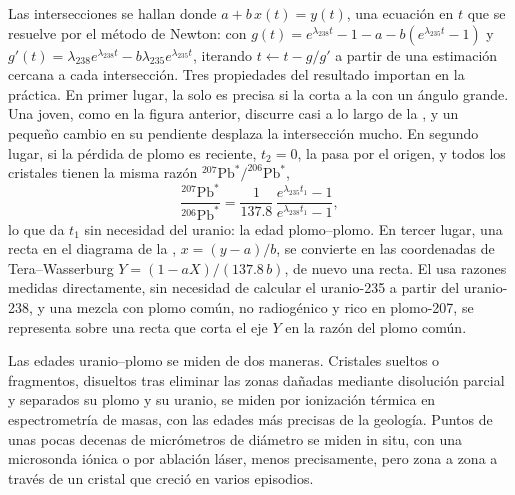 
Las intersecciones se hallan donde $a + b\,x(t) = y(t)$, una ecuación en $t$ que
se resuelve por el método de Newton: con $g(t) = e^{\lambda_{238}t} - 1 - a -
b(e^{\lambda_{235}t} - 1)$ y $g'(t) = \lambda_{238}e^{\lambda_{238}t} -
b\lambda_{235}e^{\lambda_{235}t}$, iterando $t \leftarrow t - g/g'$ a partir de una estimación
cercana a cada intersección. Tres propiedades del resultado importan en la práctica.
En primer lugar, la  solo es precisa si la  corta a la
 con un ángulo grande. Una  joven, como en la figura anterior, discurre
casi a lo largo de la , y un pequeño cambio en su pendiente desplaza la
intersección mucho. En segundo lugar, si la pérdida de plomo es reciente, $t_2 = 0$, la 
pasa por el origen, y todos los cristales tienen la misma
razón $^{207}\mathrm{Pb}^*/^{206}\mathrm{Pb}^*$,
\[
\frac{^{207}\mathrm{Pb}^*}{^{206}\mathrm{Pb}^*} = \frac{1}{137.8}\,
\frac{e^{\lambda_{235}t_1} - 1}{e^{\lambda_{238}t_1} - 1},
\]
lo que da $t_1$ sin necesidad del uranio: la edad plomo--plomo. En tercer lugar, una recta en el
diagrama de la , $x = (y - a)/b$, se convierte en las coordenadas de Tera--Wasserburg
$Y = (1 - aX)/(137.8\,b)$, de nuevo una recta. El 
usa razones medidas directamente, sin necesidad de calcular el uranio-235
a partir del uranio-238, y una mezcla con plomo común, no radiogénico y rico en
plomo-207, se representa sobre una recta que corta el eje $Y$ en la razón del
plomo común.

Las edades uranio--plomo se miden de dos maneras. Cristales sueltos o fragmentos,
disueltos tras eliminar las zonas dañadas mediante disolución parcial
y separados su plomo y su uranio, se miden por ionización térmica
en espectrometría de masas, con las edades más precisas de la geología. Puntos de unas pocas decenas de
micrómetros de diámetro se miden in situ, con una microsonda iónica o por ablación láser,
menos precisamente, pero zona a zona a través de un cristal que creció en
varios episodios.

